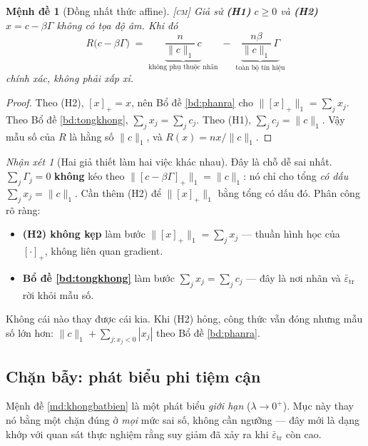 \documentclass[11pt,a4paper]{article}
\newtheorem{menhde}[dinhly]{Mệnh đề}
\theoremstyle{remark}
\newtheorem{nhanxet}[dinhly]{Nhận xét}
\newcommand{\pos}[1]{\left[#1\right]_+}
\newcommand{\epstr}{\bar\varepsilon_{\mathrm{tr}}}
\begin{document}
\begin{menhde}[Đồng nhất thức affine]
\label{md:affine}
\textsc{[cm]}\; Giả sử \textbf{(H1)} $c\ge0$ và \textbf{(H2)} $x=c-\beta\Gamma$
không có tọa độ âm. Khi đó
\begin{equation}
R\bigl(c-\beta\Gamma\bigr)
\;=\;\underbrace{\frac{n}{\|c\|_1}\,c}_{\text{không phụ thuộc nhãn}}
\;-\;\underbrace{\frac{n\beta}{\|c\|_1}\,\Gamma}_{\text{toàn bộ tín hiệu}}
\label{eq:affine}
\end{equation}
\emph{chính xác}, không phải xấp xỉ.
\end{menhde}

\begin{proof}
Theo (H2), $\pos{x}=x$, nên Bổ đề \ref{bd:phanra} cho
$\|\pos{x}\|_1=\sum_j x_j$. Theo Bổ đề \ref{bd:tongkhong},
$\sum_j x_j=\sum_j c_j$. Theo (H1), $\sum_j c_j=\|c\|_1$. Vậy mẫu số của $R$
là hằng số $\|c\|_1$, và $R(x)=nx/\|c\|_1$.
\end{proof}

\begin{nhanxet}[Hai giả thiết làm hai việc khác nhau]
\label{nx:haigiathiet}
Đây là chỗ dễ sai nhất. $\sum_j\Gamma_j=0$ \textbf{không} kéo theo
$\|\pos{c-\beta\Gamma}\|_1=\|c\|_1$: nó chỉ cho tổng \emph{có dấu}
$\sum_j x_j=\|c\|_1$. Cần thêm (H2) để $\|\pos{x}\|_1$ bằng tổng có dấu đó.
Phân công rõ ràng:
\begin{itemize}
\item \textbf{(H2) không kẹp} làm bước $\|\pos{x}\|_1=\sum_j x_j$ --- thuần
  hình học của $\pos{\cdot}$, không liên quan gradient.
\item \textbf{Bổ đề \ref{bd:tongkhong}} làm bước $\sum_j x_j=\sum_j c_j$ ---
  đây là nơi nhãn và $\epstr$ rời khỏi mẫu số.
\end{itemize}
Không cái nào thay được cái kia. Khi (H2) hỏng, công thức vẫn đóng nhưng
mẫu số lớn hơn: $\|c\|_1+\sum_{j:x_j<0}|x_j|$ theo Bổ đề \ref{bd:phanra}.
\end{nhanxet}

\subsection{Chặn bẫy: phát biểu phi tiệm cận}
\label{ssec:bay}

Mệnh đề \ref{md:khongbatbien} là một phát biểu \emph{giới hạn}
($\lambda\to0^+$). Mục này thay nó bằng một chặn đúng ở \emph{mọi} mức sai
số, không cần ngưỡng --- đây mới là dạng khớp với quan sát thực nghiệm rằng
suy giảm đã xảy ra khi $\epstr$ còn cao.
\end{document}
